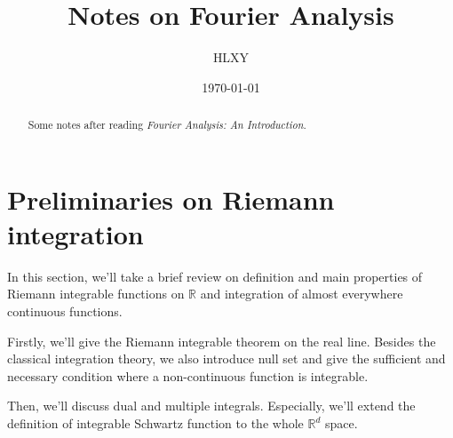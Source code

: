 \documentclass[a4paper]{article}
\title{Notes on Fourier Analysis}
\author{HLXY}
\date{\today}
\begin{document}
\maketitle
\begin{abstract}
    Some notes after reading \textit{Fourier Analysis: An Introduction}.
\end{abstract}
\tableofcontents

\section{Preliminaries on Riemann integration}
\par In this section, we'll take a brief review on definition and main properties of Riemann integrable functions on $\mathbb{R}$ and integration of almost everywhere continuous functions.
\par Firstly, we'll give the Riemann integrable theorem on the real line. Besides the classical integration theory, we also introduce null set and give the sufficient and necessary condition where a non-continuous function is integrable.
\par Then, we'll discuss dual and multiple integrals. Especially, we'll extend the definition of integrable Schwartz function to the whole $\mathbb{R}^d$ space.
\end{document}

